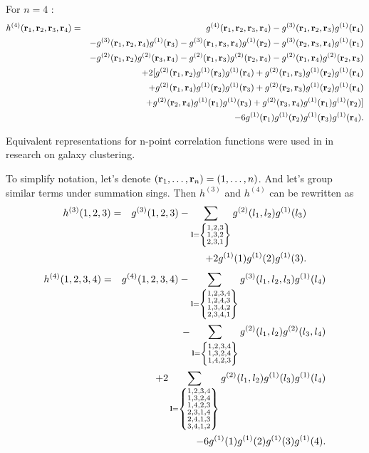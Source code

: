 For $n=4$ :
\begin{eqnarray}
h^{(4)}(\vb{r}_1, \vb{r}_2, \vb{r}_3, \vb{r}_4) &=& g^{(4)}(\vb{r}_1, \vb{r}_2, \vb{r}_3, \vb{r}_4) - g^{(3)}(\vb{r}_1, \vb{r}_2, \vb{r}_3) g^{(1)}(\vb{r}_4)
\nonumber\\
&&-g^{(3)}(\vb{r}_1, \vb{r}_2, \vb{r}_4) g^{(1)}(\vb{r}_3) -  g^{(3)}(\vb{r}_1, \vb{r}_3, \vb{r}_4) g^{(1)}(\vb{r}_2) - g^{(3)}(\vb{r}_2, \vb{r}_3, \vb{r}_4)g^{(1)}(\vb{r}_1) 
\nonumber\\
&&-g^{(2)}(\vb{r}_1,\vb{r}_2) g^{(2)}(\vb{r}_3,\vb{r}_4) - g^{(2)}(\vb{r}_1,\vb{r}_3) g^{(2)}(\vb{r}_2,\vb{r}_4) - g^{(2)}(\vb{r}_1,\vb{r}_4)g^{(2)}(\vb{r}_2,\vb{r}_3)
\nonumber\\
&& + 2[g^{(2)}(\vb{r}_1,\vb{r}_2)g^{(1)}(\vb{r}_3) g^{(1)}(\vb{r}_4) + g^{(2)}(\vb{r}_1,\vb{r}_3) g^{(1)}(\vb{r}_2) g^{(1)}(\vb{r}_4) 
\nonumber\\
&& + g^{(2)}(\vb{r}_1,\vb{r}_4)g^{(1)}(\vb{r}_2)g^{(1)}(\vb{r}_3) + g^{(2)}(\vb{r}_2,\vb{r}_3)g^{(1)}(\vb{r}_2) g^{(1)}(\vb{r}_4)
\nonumber\\
&& + g^{(2)}(\vb{r}_2,\vb{r}_4)g^{(1)}(\vb{r}_1) g^{(1)}(\vb{r}_3) + g^{(2)}(\vb{r}_3,\vb{r}_4)g^{(1)}(\vb{r}_1) g^{(1)}(\vb{r}_2) ]
\nonumber\\
&&-6g^{(1)}(\vb{r}_1) g^{(1)}(\vb{r}_2)g^{(1)}(\vb{r}_3) g^{(1)}(\vb{r}_4).
\end{eqnarray}

Equivalent representations for n-point correlation functions were used in \cite{white1979} in research on galaxy clustering.

To simplify notation, let's denote $(\vb{r}_1, \dotsc, \vb{r}_n) = (1, \dotsc, n)$. And let's group similar terms under summation sings.
Then $h^{(3)}$ and $h^{(4)}$ can be rewritten as
\begin{eqnarray}
h^{(3)}(1,2,3) &=& g^{(3)}(1, 2, 3) 
- \sum_{\vb l = \left\{\substack{1,2,3 \\ 1,3,2 \\ 2,3,1} \right\} } g^{(2)}(l_1,l_2) g^{(1)}(l_3)
\nonumber\\
&& +2g^{(1)}(1)g^{(1)}(2)g^{(1)}(3).
\end{eqnarray}
\begin{eqnarray}
h^{(4)}(1,2,3,4) &=& g^{(4)}(1,2,3,4) 
- \sum_{\vb l = \left\{\substack{1,2,3,4 \\ 1,2,4,3 \\ 1,3,4,2 \\ 2,3,4,1}\right\} }g^{(3)}(l_1,l_2,l_3) g^{(1)}(l_4) 
\nonumber\\
&&-\sum_{\vb l = \left\{ \substack{1,2,3,4 \\ 1,3,2,4 \\ 1,4,2,3} \right\}}g^{(2)}(l_1,l_2) g^{(2)}(l_3,l_4)
\nonumber\\
&& + 2\sum_{\vb l = \left\{\substack{1,2,3,4 \\ 1,3,2,4 \\ 1,4,2,3 \\ 2,3,1,4 \\ 2,4,1,3 \\ 3,4,1,2} \right\}} g^{(2)}(l_1,l_2)g^{(1)}(l_3) g^{(1)}(l_4) 
\nonumber\\
&&-6g^{(1)}(1) g^{(1)}(2)g^{(1)}(3) g^{(1)}(4).
\end{eqnarray}

